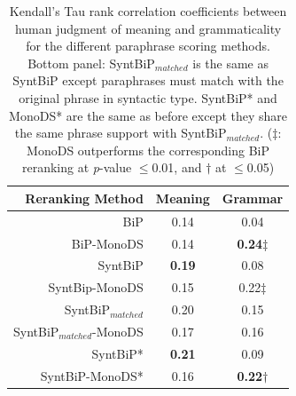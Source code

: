 \documentclass[11pt]{article}
\begin{document}
\begin{table}%
\begin{center}
\begin{tabular}{rcc}%
\hline\hline \bf \footnotesize Reranking Method & \bf \footnotesize Meaning & \bf \footnotesize Grammar \\ \hline
{\scriptsize BiP} & {\scriptsize 0.14} & {\scriptsize 0.04} \\
{\scriptsize BiP-MonoDS} & {\scriptsize 0.14} & {\scriptsize \bf 0.24$\ddagger$} \\
{\scriptsize SyntBiP} & {\scriptsize \bf 0.19}& {\scriptsize 0.08} \\
{\scriptsize SyntBip-MonoDS} & {\scriptsize 0.15} & {\scriptsize 0.22$\ddagger$} \\
\hline 
{\scriptsize SyntBiP$_{matched}$} &  {\scriptsize 0.20} & {\scriptsize 0.15} \\
{\scriptsize SyntBiP$_{matched}$-MonoDS}&  {\scriptsize 0.17} & {\scriptsize 0.16} \\
{\scriptsize SyntBiP*} &  {\scriptsize \bf 0.21} & {\scriptsize 0.09} \\
{\scriptsize SyntBiP-MonoDS*}&  {\scriptsize 0.16} & {\scriptsize \bf 0.22$\dagger$} \\
\hline
\end{tabular}
\end{center}
\caption{Kendall's Tau rank correlation coefficients between human judgment of meaning and grammaticality for the different paraphrase scoring methods. Bottom panel: SyntBiP$_{matched}$ is the same as SyntBiP except paraphrases must match with the original phrase in syntactic type. SyntBiP* and MonoDS* are the same as before except they share the same phrase support with SyntBiP$_{matched}$. ($\ddagger$: MonoDS outperforms the corresponding BiP reranking at \emph{p}-value $\le$0.01, and $\dagger$ at $\le$0.05)\vspace{-.12cm}}
\label{tbl:table4} 
\end{table}
%
%
\end{document}
